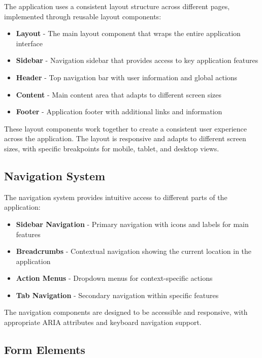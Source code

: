 The application uses a consistent layout structure across different pages, implemented through reusable layout components:

\begin{itemize}
  \item \textbf{Layout} - The main layout component that wraps the entire application interface
  \item \textbf{Sidebar} - Navigation sidebar that provides access to key application features
  \item \textbf{Header} - Top navigation bar with user information and global actions
  \item \textbf{Content} - Main content area that adapts to different screen sizes
  \item \textbf{Footer} - Application footer with additional links and information
\end{itemize}

These layout components work together to create a consistent user experience across the application. The layout is responsive and adapts to different screen sizes, with specific breakpoints for mobile, tablet, and desktop views.

\subsection{Navigation System}

The navigation system provides intuitive access to different parts of the application:

\begin{itemize}
  \item \textbf{Sidebar Navigation} - Primary navigation with icons and labels for main features
  \item \textbf{Breadcrumbs} - Contextual navigation showing the current location in the application
  \item \textbf{Action Menus} - Dropdown menus for context-specific actions
  \item \textbf{Tab Navigation} - Secondary navigation within specific features
\end{itemize}

The navigation components are designed to be accessible and responsive, with appropriate ARIA attributes and keyboard navigation support.

\subsection{Form Elements}

